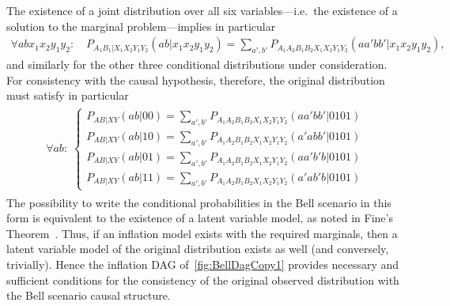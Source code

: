 The existence of a joint distribution over all six variables---i.e.~the existence of a solution to the marginal problem---implies in particular
\begin{align}
	\forall{a b x_1 x_2 y_1 y_2}: \quad P_{A_1 B_1 | X_1 X_2 Y_1 Y_2}(a b | x_1 x_2 y_1 y_2)  =  \sum\nolimits_{a',b'} P_{A_1 A_2 B_1 B_2 X_1 X_2 Y_1 Y_2}(a a' b b'|x_1 x_2 y_1 y_2),
\end{align}
and similarly for the other three conditional distributions under consideration. For consistency with the causal hypothesis, therefore, the original distribution must satisfy in particular
\begin{align}\begin{split}\label{eq:finalBellstep}\forall{a b}:\; \begin{cases}
	P_{A B | X Y}(a b | 0 0)  =  \sum\nolimits_{a',b'} P_{A_1 A_2 B_1 B_2 X_1 X_2 Y_1 Y_2}(a a' b b'|0101) \\
	P_{A B | X Y}(a b | 1 0)  =  \sum\nolimits_{a',b'} P_{A_1 A_2 B_1 B_2 X_1 X_2 Y_1 Y_2}(a' a b b'|0101) \\
	P_{A B | X Y}(a b | 0 1)  =  \sum\nolimits_{a',b'} P_{A_1 A_2 B_1 B_2 X_1 X_2 Y_1 Y_2}(a a' b' b|0101) \\
	P_{A B | X Y}(a b | 1 1)  =  \sum\nolimits_{a',b'} P_{A_1 A_2 B_1 B_2 X_1 X_2 Y_1 Y_2}(a' a b' b|0101)
\end{cases}\end{split}\end{align}
The possibility to write the conditional probabilities in the Bell scenario in this form is equivalent to the existence of a latent variable model, as noted in Fine's Theorem~\cite{FineTheorem}. Thus, if an inflation model exists with the required marginals, then a latent variable model of the original distribution exists as well (and conversely, trivially). Hence the inflation DAG of~\cref{fig:BellDagCopy1} provides necessary and sufficient conditions for the consistency of the original observed distribution with the Bell scenario causal structure.


